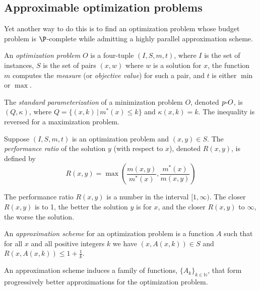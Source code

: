 \subsection{Approximable optimization problems}

Yet another way to do this is to find an optimization problem whose budget problem is $\P$-complete while admitting a highly parallel approximation scheme.

\begin{definition}
  An \emph{optimization problem} $O$ is a four-tuple $(I, S, m, t)$, where $I$ is the set of instances, $S$ is the set of pairs $(x, w)$ where $w$ is a solution for $x$, the function $m$ computes the \emph{measure} (or \emph{objective value}) for such a pair, and $t$ is either $\min$ or $\max$.
\end{definition}

\begin{definition}\label{def:standard}
  The \emph{standard parameterization} of a minimization problem $O$, denoted $p\textnormal{-}{O}$, is $(Q, \kappa)$, where $Q = \{ (x, k) \, | \, m^*(x) \leq k \}$ and $\kappa(x, k) = k$.
  The inequality is reversed for a maximization problem.
\end{definition}

\begin{definition}
  Suppose $(I, S, m, t)$ is an optimization problem and $(x, y) \in S$.
  The \emph{performance ratio} of the solution $y$ (with respect to $x$), denoted $R(x, y)$, is defined by
  \[
  R(x, y) = \max \left(\frac{m(x, y)}{m^*(x)}, \frac{m^*(x)}{m(x, y)}\right)
  \]
\end{definition}

The performance ratio $R(x, y)$ is a number in the interval $[1, \infty)$.
The closer $R(x, y)$ is to 1, the better the solution $y$ is for $x$, and the closer $R(x, y)$ to $\infty$, the worse the solution.

\begin{definition}
  An \emph{approximation scheme} for an optimization problem is a function $A$ such that for all $x$ and all positive integers $k$ we have $(x, A(x, k)) \in S$ and $R(x, A(x, k)) \leq 1 + \frac{1}{k}$.
\end{definition}

An approximation scheme induces a family of functions, $\{A_k\}_{k \in \mathbb{N}}$, that form progressively better approximations for the optimization problem.


